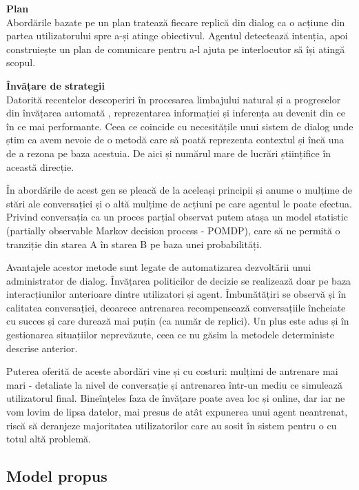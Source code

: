 \textbf{Plan}\\
Abordările bazate pe un plan tratează fiecare replică din dialog ca o acțiune din partea utilizatorului spre a-și atinge obiectivul. Agentul detectează intenția, apoi construiește un plan de comunicare pentru a-l ajuta pe interlocutor să își atingă scopul.

\textbf{Învățare de strategii}\\
Datorită recentelor descoperiri în procesarea limbajului natural \cite{metode-de-reprezentare} și a progreselor din învățarea automată \cite{rnn}, reprezentarea informației și inferența au devenit din ce în ce mai performante. Ceea ce coincide cu necesitățile unui sistem de dialog unde știm ca avem nevoie de o metodă care să poată reprezenta contextul și încă una de a rezona pe baza acestuia. De aici și numărul mare de lucrări științifice în această direcție.

În abordările de acest gen se pleacă de la aceleași principii și anume o mulțime de stări ale conversației și o altă mulțime de acțiuni pe care agentul le poate efectua. Privind conversația ca un proces parțial observat putem atașa un model statistic (partially observable Markov decision process - POMDP), care să ne permită o tranziție din starea A în starea B pe baza unei probabilități.

Avantajele acestor metode sunt legate de automatizarea dezvoltării unui administrator de dialog. Învățarea politicilor de decizie se realizează doar pe baza interacțiunilor anterioare dintre utilizatori și agent. Îmbunătățiri se observă și în calitatea conversației, deoarece antrenarea recompensează conversațiile încheiate cu succes și care durează mai puțin (ca număr de replici). Un plus este adus și în gestionarea situațiilor neprevăzute, ceea ce nu găsim la metodele deterministe descrise anterior.

Puterea oferită de aceste abordări vine și cu costuri: mulțimi de antrenare mai mari - detaliate la nivel de conversație și antrenarea într-un mediu ce simulează utilizatorul final. Bineînțeles faza de învățare poate avea loc și online, dar iar ne vom lovim de lipsa datelor, mai presus de atât expunerea unui agent neantrenat, riscă să deranjeze majoritatea utilizatorilor care au sosit în sistem pentru o cu totul altă problemă.

\subsection{Model propus}